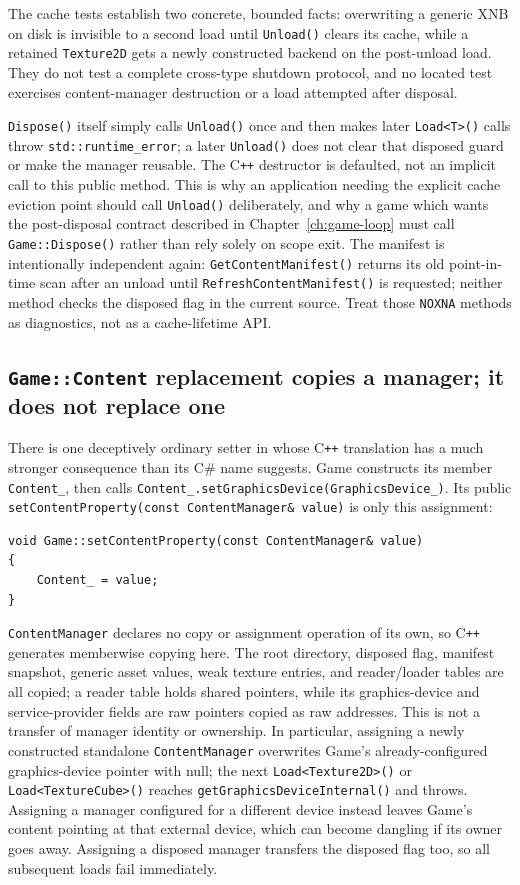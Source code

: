 The cache tests establish two concrete, bounded facts: overwriting a generic XNB on disk is
invisible to a second load until \texttt{Unload()} clears its cache, while a retained
\texttt{Texture2D} gets a newly constructed backend on the post-unload load. They do not test a
complete cross-type shutdown protocol, and no located test exercises content-manager destruction
or a load attempted after disposal.

\texttt{Dispose()} itself simply calls \texttt{Unload()} once and then makes later
\texttt{Load<T>()} calls throw \texttt{std::runtime\_error}; a later \texttt{Unload()} does not
clear that disposed guard or make the manager reusable. The C\texttt{++} destructor is defaulted,
not an implicit call to this public method. This is why an application needing the explicit cache
eviction point should call \texttt{Unload()} deliberately, and why a game which wants the
post-disposal contract described in Chapter~\ref{ch:game-loop} must call \texttt{Game::Dispose()}
rather than rely solely on scope exit. The manifest is intentionally independent again:
\texttt{GetContentManifest()} returns its old point-in-time scan after an unload until
\texttt{RefreshContentManifest()} is requested; neither method checks the disposed flag in the
current source. Treat those \texttt{NOXNA} methods as diagnostics, not as a cache-lifetime API.

\subsection{\texttt{Game::Content} replacement copies a manager; it does not replace one}

There is one deceptively ordinary setter in  whose C\texttt{++} translation has a
much stronger consequence than its C\# name suggests. Game constructs its member
\texttt{Content\_}, then calls \texttt{Content\_.setGraphicsDevice(GraphicsDevice\_)}. Its public
\texttt{setContentProperty(const ContentManager\& value)} is only this assignment:

\begin{lstlisting}
void Game::setContentProperty(const ContentManager& value)
{
    Content_ = value;
}
\end{lstlisting}

\texttt{ContentManager} declares no copy or assignment operation of its own, so C\texttt{++}
generates memberwise copying here. The root directory, disposed flag, manifest snapshot, generic
asset values, weak texture entries, and reader/loader tables are all copied; a reader table holds
shared pointers, while its graphics-device and service-provider fields are raw pointers copied as
raw addresses. This is not a transfer of manager identity or ownership. In particular, assigning
a newly constructed standalone \texttt{ContentManager} overwrites Game's already-configured
graphics-device pointer with null; the next \texttt{Load<Texture2D>()} or
\texttt{Load<TextureCube>()} reaches \texttt{getGraphicsDeviceInternal()} and throws. Assigning a
manager configured for a different device instead leaves Game's content pointing at that external
device, which can become dangling if its owner goes away. Assigning a disposed manager transfers
the disposed flag too, so all subsequent loads fail immediately.

